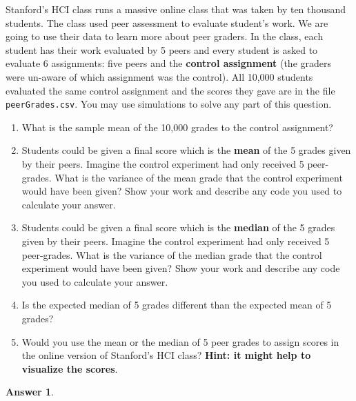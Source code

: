 \documentclass[12pt]{article}
\renewcommand{\(}{\left(}
\renewcommand{\)}{\right)}
\theoremstyle{definition}
\newtheorem*{answer}{Answer}
\begin{document}
\begin{enumerate}
{    %
    \item \text{[Coding]} Stanford's HCI class runs a massive online class that was taken by ten thousand students. The class used peer assessment to evaluate student's work. We are going to use their data to learn more about peer graders. In the class, each student has their work evaluated by 5 peers and every student is asked to evaluate 6 assignments: five peers and the \textbf{control assignment} (the graders were un-aware of which assignment was the control). All 10,000 students evaluated the same control assignment and the scores they gave are in the file \texttt{peerGrades.csv}. You may use simulations to solve any part of this question.
    \begin{enumerate}
        \item What is the sample mean of the 10,000 grades to the control assignment?
        \item Students could be given a final score which is the \textbf{mean} of the 5 grades given by their peers. Imagine the control experiment had only received 5 peer-grades. What is the variance of the mean grade that the control experiment would have been given? Show your work and describe any code you used to calculate your answer.
        \item Students could be given a final score which is the \textbf{median} of the 5 grades given by their peers. Imagine the control experiment had only received 5 peer-grades. What is the variance of the median grade that the control experiment would have been given? Show your work and describe any code you used to calculate your answer.
        \item Is the expected median of 5 grades different than the expected mean of 5 grades?
        \item Would you use the mean or the median of 5 peer grades to assign scores in the online version of Stanford's HCI class? \textbf{Hint: it might help to visualize the scores}.
    \end{enumerate}
    
    \begin{shaded}
    \begin{answer}
    
    \end{answer}
    \end{shaded}
    \newpage
    
}
\end{enumerate}
\end{document}
